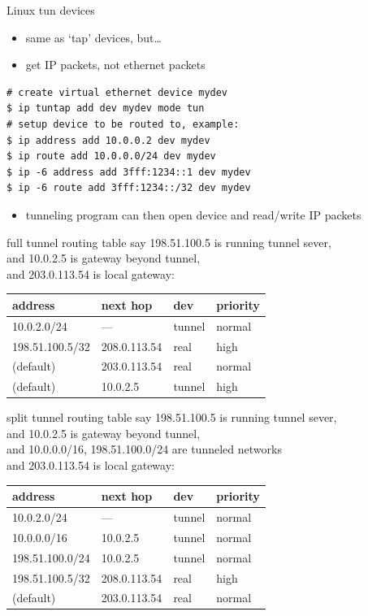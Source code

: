 
\begin{frame}[fragile]{Linux tun devices}
    \begin{itemize}
    \item same as `tap' devices, but\ldots
    \item get IP packets, not ethernet packets
    \end{itemize}
\begin{Verbatim}[fontsize=\fontsize{10}{11}]
# create virtual ethernet device mydev
$ ip tuntap add dev mydev mode tun
# setup device to be routed to, example:
$ ip address add 10.0.0.2 dev mydev
$ ip route add 10.0.0.0/24 dev mydev
$ ip -6 address add 3fff:1234::1 dev mydev
$ ip -6 route add 3fff:1234::/32 dev mydev
\end{Verbatim}
    \begin{itemize}
    \item tunneling program can then open device and read/write IP packets
    \end{itemize}
\end{frame}

\begin{frame}[fragile]{full tunnel routing table}
say 198.51.100.5 is running tunnel sever, \\
and 10.0.2.5  is gateway beyond tunnel, \\
and 203.0.113.54 is local gateway: \\
\begin{tabular}{l|l|l|l}
address & next hop & dev & priority\\ \hline
10.0.2.0/24 & --- & tunnel & normal \\
198.51.100.5/32 & 208.0.113.54 & real & high\\
(default) & 203.0.113.54 & real & normal \\
(default) & 10.0.2.5 & tunnel & high \\
\end{tabular}
\end{frame}


\begin{frame}[fragile]{split tunnel routing table}
say 198.51.100.5 is running tunnel sever, \\
and 10.0.2.5  is gateway beyond tunnel, \\
and 10.0.0.0/16, 198.51.100.0/24 are tunneled networks \\
and 203.0.113.54 is local gateway: \\
\begin{tabular}{l|l|l|l}
address & next hop & dev & priority\\ \hline
10.0.2.0/24 & --- & tunnel & normal \\
10.0.0.0/16 & 10.0.2.5& tunnel & normal \\
198.51.100.0/24 & 10.0.2.5& tunnel & normal \\
198.51.100.5/32 & 208.0.113.54 & real & high\\
(default) & 203.0.113.54 & real & normal \\
\end{tabular}
\end{frame}

